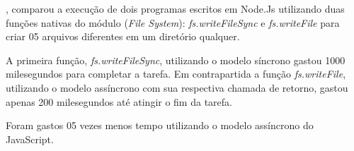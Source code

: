   , comparou a execução de dois programas escritos em Node.Js utilizando duas funções nativas
  do módulo (\textit{File System}): \textit{fs.writeFileSync} e \textit{fs.writeFile} para criar 05 arquivos diferentes 
  em um diretório qualquer.
  
  A primeira função, \textit{fs.writeFileSync}, utilizando o modelo síncrono gastou 1000 milesegundos para completar a tarefa. 
  Em contrapartida a função \textit{fs.writeFile}, utilizando o modelo assíncrono com sua respectiva chamada de retorno, gastou
  apenas 200 milesegundos até atingir o fim da tarefa. 
  
  Foram gastos 05 vezes menos tempo utilizando o modelo assíncrono do JavaScript.
  
  
  

 

